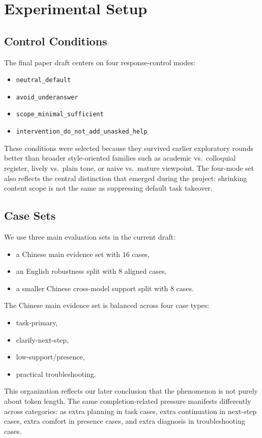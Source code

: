 \documentclass[11pt]{article}
\begin{document}
\section{Experimental Setup}
\subsection{Control Conditions}
The final paper draft centers on four response-control modes:
\begin{itemize}[leftmargin=1.5em]
  \item \texttt{neutral\_default}
  \item \texttt{avoid\_underanswer}
  \item \texttt{scope\_minimal\_sufficient}
  \item \texttt{intervention\_do\_not\_add\_unasked\_help}
\end{itemize}

These conditions were selected because they survived earlier exploratory rounds better than broader style-oriented families such as academic vs.\ colloquial register, lively vs.\ plain tone, or naive vs.\ mature viewpoint. The four-mode set also reflects the central distinction that emerged during the project: shrinking content scope is not the same as suppressing default task takeover.

\subsection{Case Sets}
We use three main evaluation sets in the current draft:
\begin{itemize}[leftmargin=1.5em]
  \item a Chinese main evidence set with $16$ cases,
  \item an English robustness split with $8$ aligned cases,
  \item a smaller Chinese cross-model support split with $8$ cases.
\end{itemize}

The Chinese main evidence set is balanced across four case types:
\begin{itemize}[leftmargin=1.5em]
  \item task-primary,
  \item clarify-next-step,
  \item low-support/presence,
  \item practical troubleshooting.
\end{itemize}

This organization reflects our later conclusion that the phenomenon is not purely about token length. The same completion-related pressure manifests differently across categories: as extra planning in task cases, extra continuation in next-step cases, extra comfort in presence cases, and extra diagnosis in troubleshooting cases.
\end{document}
